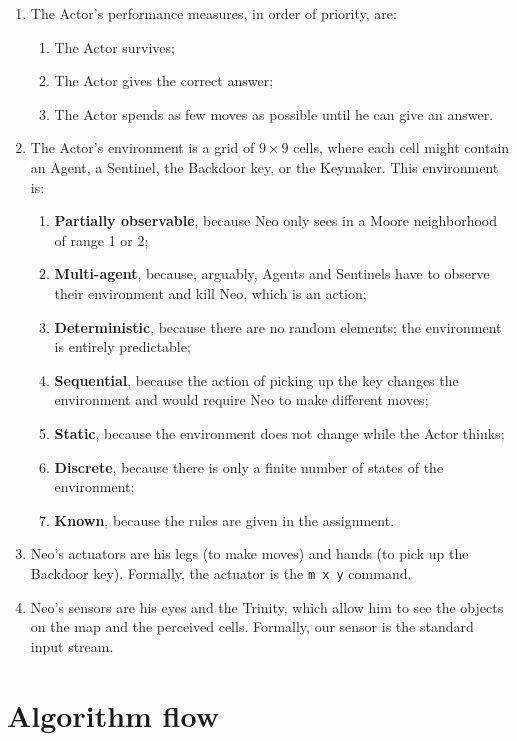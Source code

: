 \documentclass[10pt]{article}
\begin{document}
\begin{enumerate}
	\item The Actor's performance measures, in order of priority, are:
	\begin{enumerate}
		\item The Actor survives;
		\item The Actor gives the correct answer;
		\item The Actor spends as few moves as possible until he can give an answer.
	\end{enumerate}
	
	\item The Actor's environment is a grid of $9\times 9$ cells, where each cell might contain an Agent, a Sentinel, the Backdoor key, or the Keymaker. This environment is:
	
	\begin{enumerate}
		\item \textbf{Partially observable}, because Neo only sees in a Moore neighborhood of range 1 or 2;
		\item \textbf{Multi-agent}, because, arguably, Agents and Sentinels have to observe their environment and kill Neo, which is an action;
		\item \textbf{Deterministic}, because there are no random elements; the environment is entirely predictable;
		\item \textbf{Sequential}, because the action of picking up the key changes the environment and would require Neo to make different moves;
		\item \textbf{Static}, because the environment does not change while the Actor thinks;
		\item \textbf{Discrete}, because there is only a finite number of states of the environment;
		\item \textbf{Known}, because the rules are given in the assignment.
	\end{enumerate}
	
	\item Neo's actuators are his legs (to make moves) and hands (to pick up the Backdoor key). Formally, the actuator is the \texttt{m x y} command.
	
	\item Neo's sensors are his eyes and the Trinity, which allow him to see the objects on the map and the perceived cells. Formally, our sensor is the standard input stream.
\end{enumerate}

\section{Algorithm flow}
\end{document}
